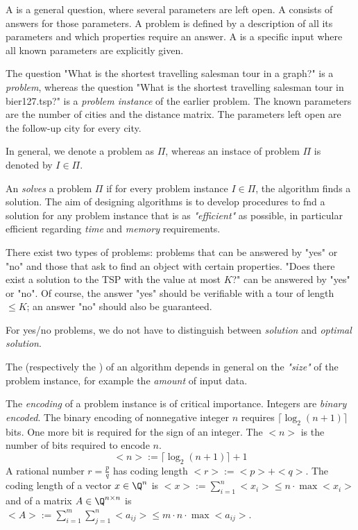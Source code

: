 \begin{lec}[2012-12-12]\end{lec}


A  is a general question, where several parameters are left open. A  consists of answers for those parameters. A problem is defined by a description of all its parameters and which properties require an answer. A  is a specific input where all known parameters are explicitly given. 

The question "What is the shortest travelling salesman tour in a graph?" is a \emph{problem}, whereas the question "What is the shortest travelling salesman tour in bier127.tsp?" is a \emph{problem instance} of the earlier problem. The known parameters are the number of cities and the distance matrix. The parameters left open are the follow-up city for every city.

In general, we denote a problem as $\Pi$, whereas an instace of problem $\Pi$ is denoted by $I \in \Pi$.

An  \emph{solves} a problem $\Pi$ if for every problem instance $I \in \Pi$, the algorithm finds a solution. The aim of designing algorithms is to develop procedures to fnd a solution for any problem instance that is as \emph{"efficient"} as possible, in particular efficient regarding \emph{time} and \emph{memory} requirements.

There exist two types of problems: problems that can be answered by "yes" or "no" and those that ask to find an object with certain properties.
"Does there exist a solution to the TSP with the value at most $K$?" can be answered by "yes" or "no". Of course, the answer "yes" should be verifiable with a tour of length $\leq K$; an answer "no" should also be guaranteed.

For yes/no problems, we do not have to distinguish between \emph{solution} and \emph{optimal solution}.

The  (respectively the ) of an algorithm depends in general on the \emph{"size"} of the problem instance, for example the \emph{amount} of input data.

The \emph{encoding} of a problem instance is of critical importance. Integers are \emph{binary encoded}. The binary encoding of nonnegative integer $n$ requires $\lceil \log_2(n+1) \rceil$ bits. One more bit is required for the sign of an integer. The  $<n>$ is the number of bits required to encode $n$.
\[
	<n>:=\lceil \log_2(n+1) \rceil + 1
\]
A rational number $r = \frac pq$ has coding length $<r> := <p> + <q>$.
The coding length of a vector $x \in \Q^n$ is $<x>:= \sum\limits_{i=1}^n<x_i> \leq n \cdot \max<  x_i >$ and of a matrix $A \in \Q^{n \times n}$ is $<A> := \sum\limits_{i=1}^m\sum\limits_{j=1}^n<a_{ij}> \leq m \cdot n \cdot\max< a_{ij} >$.

